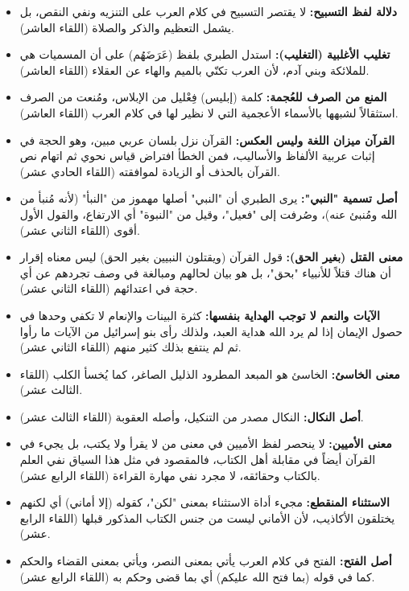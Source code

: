 \begin{itemize}
    \item \textbf{دلالة لفظ التسبيح:} لا يقتصر التسبيح في كلام العرب على التنزيه ونفي النقص، بل يشمل التعظيم والذكر والصلاة (اللقاء العاشر).
    \item \textbf{تغليب الأغلبية (التغليب):} استدل الطبري بلفظ (عَرَضَهُم) على أن المسميات هي للملائكة وبني آدم، لأن العرب تكنّي بالميم والهاء عن العقلاء (اللقاء العاشر).
    \item \textbf{المنع من الصرف للعُجمة:} كلمة (إبليس) فِعْليل من الإبلاس، ومُنعت من الصرف استثقالاً لشبهها بالأسماء الأعجمية التي لا نظير لها في كلام العرب (اللقاء العاشر).
    \item \textbf{القرآن ميزان اللغة وليس العكس:} القرآن نزل بلسان عربي مبين، وهو الحجة في إثبات عربية الألفاظ والأساليب، فمن الخطأ افتراض قياس نحوي ثم اتهام نص القرآن بالحذف أو الزيادة لموافقته (اللقاء الحادي عشر).
    \item \textbf{أصل تسمية "النبي":} يرى الطبري أن "النبي" أصلها مهموز من "النبأ" (لأنه مُنبأ من الله ومُنبئ عنه)، وصُرفت إلى "فعيل"، وقيل من "النبوة" أي الارتفاع، والقول الأول أقوى (اللقاء الثاني عشر).
    \item \textbf{معنى القتل (بغير الحق):} قول القرآن (ويقتلون النبيين بغير الحق) ليس معناه إقرار أن هناك قتلاً للأنبياء "بحق"، بل هو بيان لحالهم ومبالغة في وصف تجردهم عن أي حجة في اعتدائهم (اللقاء الثاني عشر).
    \item \textbf{الآيات والنعم لا توجب الهداية بنفسها:} كثرة البينات والإنعام لا تكفي وحدها في حصول الإيمان إذا لم يرد الله هداية العبد، ولذلك رأى بنو إسرائيل من الآيات ما رأوا ثم لم ينتفع بذلك كثير منهم (اللقاء الثاني عشر).
    \item \textbf{معنى الخاسئ:} الخاسئ هو المبعد المطرود الذليل الصاغر، كما يُخسأ الكلب (اللقاء الثالث عشر).
    \item \textbf{أصل النكال:} النكال مصدر من التنكيل، وأصله العقوبة (اللقاء الثالث عشر).
    \item \textbf{معنى الأميين:} لا ينحصر لفظ الأميين في معنى من لا يقرأ ولا يكتب، بل يجيء في القرآن أيضاً في مقابلة أهل الكتاب، فالمقصود في مثل هذا السياق نفي العلم بالكتاب وحقائقه، لا مجرد نفي مهارة القراءة (اللقاء الرابع عشر).
    \item \textbf{الاستثناء المنقطع:} مجيء أداة الاستثناء بمعنى "لكن"، كقوله (إلا أماني) أي لكنهم يختلقون الأكاذيب، لأن الأماني ليست من جنس الكتاب المذكور قبلها (اللقاء الرابع عشر).
    \item \textbf{أصل الفتح:} الفتح في كلام العرب يأتي بمعنى النصر، ويأتي بمعنى القضاء والحكم كما في قوله (بما فتح الله عليكم) أي بما قضى وحكم به (اللقاء الرابع عشر).

\end{itemize}
